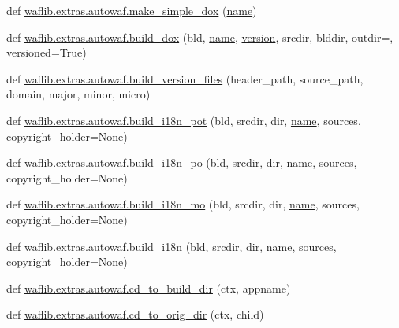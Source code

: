 \begin{DoxyCompactItemize}
\item 
def \hyperlink{namespacewaflib_1_1extras_1_1autowaf_a2cdf474b0fc857e31088b6c557551adf}{waflib.\+extras.\+autowaf.\+make\+\_\+simple\+\_\+dox} (\hyperlink{lib_2expat_8h_a1b49b495b59f9e73205b69ad1a2965b0}{name})
\item 
def \hyperlink{namespacewaflib_1_1extras_1_1autowaf_aa326d8cb276e0c9425460e07230fcd6c}{waflib.\+extras.\+autowaf.\+build\+\_\+dox} (bld, \hyperlink{lib_2expat_8h_a1b49b495b59f9e73205b69ad1a2965b0}{name}, \hyperlink{lib_2expat_8h_aec5db107b91447a96c47961ce9df2660}{version}, srcdir, blddir, outdir=\textquotesingle{}\textquotesingle{}, versioned=True)
\item 
def \hyperlink{namespacewaflib_1_1extras_1_1autowaf_a57c006e489535681633401b92f27bff1}{waflib.\+extras.\+autowaf.\+build\+\_\+version\+\_\+files} (header\+\_\+path, source\+\_\+path, domain, major, minor, micro)
\item 
def \hyperlink{namespacewaflib_1_1extras_1_1autowaf_a129b90912f51a7d6b205911e0f9604f9}{waflib.\+extras.\+autowaf.\+build\+\_\+i18n\+\_\+pot} (bld, srcdir, dir, \hyperlink{lib_2expat_8h_a1b49b495b59f9e73205b69ad1a2965b0}{name}, sources, copyright\+\_\+holder=None)
\item 
def \hyperlink{namespacewaflib_1_1extras_1_1autowaf_afcd5d32b2bad38fd561677ee6f803640}{waflib.\+extras.\+autowaf.\+build\+\_\+i18n\+\_\+po} (bld, srcdir, dir, \hyperlink{lib_2expat_8h_a1b49b495b59f9e73205b69ad1a2965b0}{name}, sources, copyright\+\_\+holder=None)
\item 
def \hyperlink{namespacewaflib_1_1extras_1_1autowaf_ad523424cca27d7e95c00bda8ba12daf0}{waflib.\+extras.\+autowaf.\+build\+\_\+i18n\+\_\+mo} (bld, srcdir, dir, \hyperlink{lib_2expat_8h_a1b49b495b59f9e73205b69ad1a2965b0}{name}, sources, copyright\+\_\+holder=None)
\item 
def \hyperlink{namespacewaflib_1_1extras_1_1autowaf_ab124c243bf9c40f170a7246d59428c28}{waflib.\+extras.\+autowaf.\+build\+\_\+i18n} (bld, srcdir, dir, \hyperlink{lib_2expat_8h_a1b49b495b59f9e73205b69ad1a2965b0}{name}, sources, copyright\+\_\+holder=None)
\item 
def \hyperlink{namespacewaflib_1_1extras_1_1autowaf_a4884f8dfa00be5d295c7f18752dc75b7}{waflib.\+extras.\+autowaf.\+cd\+\_\+to\+\_\+build\+\_\+dir} (ctx, appname)
\item 
def \hyperlink{namespacewaflib_1_1extras_1_1autowaf_adf9f42c74875f458c6186ec219c4b9ad}{waflib.\+extras.\+autowaf.\+cd\+\_\+to\+\_\+orig\+\_\+dir} (ctx, child)
\item 

\end{DoxyCompactItemize}
